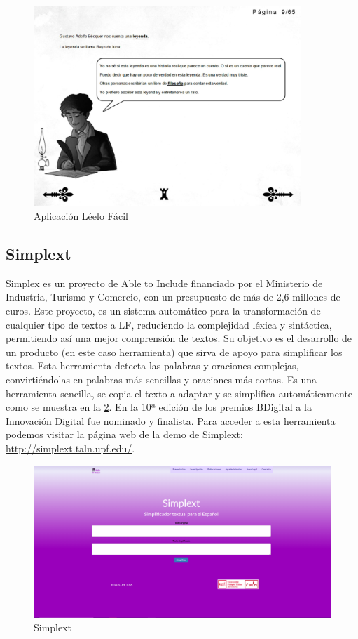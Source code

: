 \begin{figure}[h]
	\centering
	\includegraphics[width=0.9\textwidth]{Imagenes/ProyectosMateriales/leeloFacil}
	\caption{Aplicación Léelo Fácil}
	\label{fig:leeloFacil}
\end{figure} 

\subsection{Simplext }

Simplex \citep{PLN1000} es un proyecto de Able to Include financiado por el Ministerio de Industria, Turismo y Comercio, con un presupuesto de más de 2,6 millones de euros. Este proyecto, es un sistema automático para la transformación de cualquier tipo de textos a LF, reduciendo la complejidad léxica y sintáctica, permitiendo así una mejor comprensión de textos. Su objetivo es el desarrollo de un producto (en este caso herramienta) que sirva de apoyo para simplificar los textos. Esta herramienta detecta las palabras y oraciones complejas, convirtiéndolas en palabras más sencillas y oraciones más cortas. Es una herramienta sencilla, se copia el texto a adaptar y se simplifica automáticamente como se muestra en la \ref{fig:simplext}. En la 10ª edición de los premios BDigital a la Innovación Digital fue nominado y finalista.
Para acceder a esta herramienta podemos visitar la página web de la demo de Simplext: \url{http://simplext.taln.upf.edu/}.


\begin{figure}[h]
	\centering
	\includegraphics[width=1.0\textwidth]{Imagenes/ProyectosMateriales/simplext}
	\caption{Simplext}
	\label{fig:simplext}
\end{figure} 

